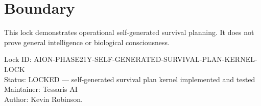 \documentclass[11pt,a4paper]{article}
\begin{document}
\section{Boundary}

This lock demonstrates operational self-generated survival planning. It does not prove general intelligence or biological consciousness.

\bigskip

\noindent
Lock ID: AION-PHASE21Y-SELF-GENERATED-SURVIVAL-PLAN-KERNEL-LOCK\\
Status: LOCKED --- self-generated survival plan kernel implemented and tested\\
Maintainer: Tessaris AI\\
Author: Kevin Robinson.
\end{document}
